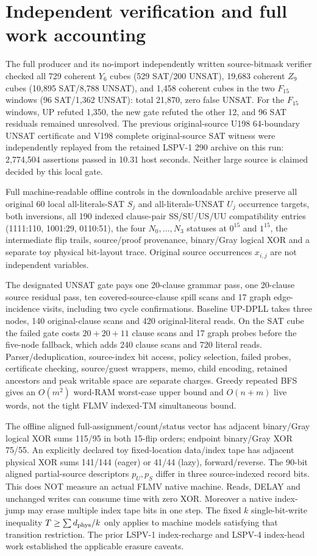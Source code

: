 \documentclass[11pt]{article}
\begin{document}
\section{Independent verification and full work accounting}
The full producer and its no-import independently written source-bitmask
verifier checked all 729 coherent $Y_6$ cubes (529 SAT/200 UNSAT),
19,683 coherent $Z_9$ cubes (10,895 SAT/8,788 UNSAT),
and 1,458 coherent cubes in the two $F_{15}$ windows
(96 SAT/1,362 UNSAT): total 21,870, zero false UNSAT.
For the $F_{15}$ windows, UP refuted 1,350, the new gate
refuted the other 12, and 96 SAT residuals remained unresolved.
The previous original-source U198 64-boundary UNSAT certificate
and V198 complete original-source SAT witness were independently
replayed from the retained LSPV-1 290 archive on this run:
2,774,504 assertions passed in 10.31 host seconds.
Neither large source is claimed decided by this local gate.

Full machine-readable offline controls in the downloadable archive
preserve all original 60 local all-literals-SAT $S_j$ and all-literals-UNSAT
$U_j$ occurrence targets, both inversions, all 190 indexed clause-pair
SS/SU/US/UU compatibility entries (1111:110, 1001:29, 0110:51),
the four $N_0,\ldots,N_3$ statuses at $0^{15}$ and $1^{15}$,
the intermediate flip trails, source/proof provenance,
binary/Gray logical XOR and a separate toy physical bit-layout trace.
Original source occurrences $x_{i,j}$ are not independent variables.

The designated UNSAT gate pays one 20-clause grammar pass,
one 20-clause source residual pass, ten covered-source-clause
spill scans and 17 graph edge-incidence visits, including two
cycle confirmations. Baseline UP-DPLL takes three nodes,
140 original-clause scans and 420 original-literal reads.
On the SAT cube the failed gate costs $20+20+11$ clause
scans and 17 graph probes before the five-node fallback,
which adds 240 clause scans and 720 literal reads.
Parser/deduplication, source-index bit access, policy selection,
failed probes, certificate checking, source/guest wrappers,
memo, child encoding, retained ancestors and peak writable
space are separate charges. Greedy repeated BFS gives an
$O(m^2)$ word-RAM worst-case upper bound and $O(n+m)$
live words, not the tight FLMV indexed-TM simultaneous bound.

The offline aligned full-assignment/count/status vector has
adjacent binary/Gray logical XOR sums 115/95 in both 15-flip
orders; endpoint binary/Gray XOR 75/55. An explicitly
declared toy fixed-location data/index tape has adjacent
physical XOR sums 141/144 (eager) or 41/44 (lazy),
forward/reverse. The 90-bit aligned partial-source descriptors
$p_U,p_S$ differ in three source-indexed record bits.
This does NOT measure an actual FLMV native machine.
Reads, DELAY and unchanged writes can consume time with
zero XOR. Moreover a native index-jump may erase multiple
index tape bits in one step. The fixed $k$ single-bit-write
inequality $T\ge\sum d_{\rm phys}/k$ only applies to
machine models satisfying that transition restriction.
The prior LSPV-1 index-recharge and LSPV-4 index-head work
established the applicable erasure caveats.
\end{document}

